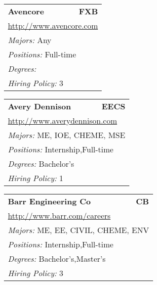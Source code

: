 \documentclass[twoside]{article}
\begin{document}
\begin{center}
\begin{multicols}{3}
\begin{FlushLeft}
\begin{minipage}{\columnwidth}
\end{minipage}
 
\begin{minipage}{\columnwidth}\begin{tabularx}{.95\columnwidth}{Xr}
                 {\Large\bf Avencore} & {\Large\bf FXB}\\
    \multicolumn{2}{p{.95\columnwidth}}{\url{http://www.avencore.com}}\\
    \multicolumn{2}{p{.95\columnwidth}}{\emph{Majors:} Any}\\
    \multicolumn{2}{p{.95\columnwidth}}{\emph{Positions:} Full-time}\\
    \multicolumn{2}{p{.95\columnwidth}}{\emph{Degrees:} }\\
    \multicolumn{2}{p{.95\columnwidth}}{\emph{Hiring Policy:} 3}\\
    \end{tabularx}
    
\end{minipage}
 
\begin{minipage}{\columnwidth}\begin{tabularx}{.95\columnwidth}{Xr}
                 {\Large\bf Avery Dennison} & {\Large\bf EECS}\\
    \multicolumn{2}{p{.95\columnwidth}}{\url{http://www.averydennison.com}}\\
    \multicolumn{2}{p{.95\columnwidth}}{\emph{Majors:} ME, IOE, CHEME, MSE}\\
    \multicolumn{2}{p{.95\columnwidth}}{\emph{Positions:} Internship,Full-time}\\
    \multicolumn{2}{p{.95\columnwidth}}{\emph{Degrees:} Bachelor's}\\
    \multicolumn{2}{p{.95\columnwidth}}{\emph{Hiring Policy:} 1}\\
    \end{tabularx}
    
\end{minipage}
 
\begin{minipage}{\columnwidth}\begin{tabularx}{.95\columnwidth}{Xr}
                 {\Large\bf Barr Engineering Co} & {\Large\bf CB}\\
    \multicolumn{2}{p{.95\columnwidth}}{\url{http://www.barr.com/careers}}\\
    \multicolumn{2}{p{.95\columnwidth}}{\emph{Majors:} ME, EE, CIVIL, CHEME, ENV}\\
    \multicolumn{2}{p{.95\columnwidth}}{\emph{Positions:} Internship,Full-time}\\
    \multicolumn{2}{p{.95\columnwidth}}{\emph{Degrees:} Bachelor's,Master's}\\
    \multicolumn{2}{p{.95\columnwidth}}{\emph{Hiring Policy:} 3}\\
    \end{tabularx}
    

\end{minipage}
\end{FlushLeft}
\end{multicols}
\end{center}
\end{document}
